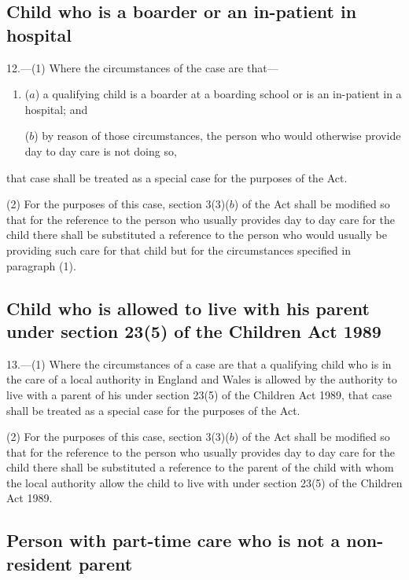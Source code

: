 \documentclass[12pt,a4paper]{article}
\begin{document}
\subsection[12. Child who is a boarder or an in-patient in hospital]{Child who is a boarder or an in-patient in hospital}

12.---(1)  Where the circumstances of the case are that—
\begin{enumerate}\item[]
($a$) a qualifying child is a boarder at a boarding school or is an in-patient in a hospital; and

($b$) by reason of those circumstances, the person who would otherwise provide day to day care is not doing so,
\end{enumerate}
that case shall be treated as a special case for the purposes of the Act.

(2) For the purposes of this case, section 3(3)($b$)  of the Act shall be modified so that for the reference to the person who usually provides day to day care for the child there shall be substituted a reference to the person who would usually be providing such care for that child but for the circumstances specified in paragraph (1).

\subsection[13. Child who is allowed to live with his parent under section 23(5) of the Children Act 1989]{Child who is allowed to live with his parent under section 23(5) of the Children Act 1989}

13.---(1)  Where the circumstances of a case are that a qualifying child who is in the care of a local authority in England and Wales is allowed by the authority to live with a parent of his under section 23(5) of the Children Act 1989, that case shall be treated as a special case for the purposes of the Act.

(2) For the purposes of this case, section 3(3)($b$)  of the Act shall be modified so that for the reference to the person who usually provides day to day care for the child there shall be substituted a reference to the parent of the child with whom the local authority allow the child to live with under section 23(5) of the Children Act 1989.

\subsection[14. Person with part-time care who is not a non-resident parent]{Person with part-time care who is not a non-resident parent}
\end{document}
